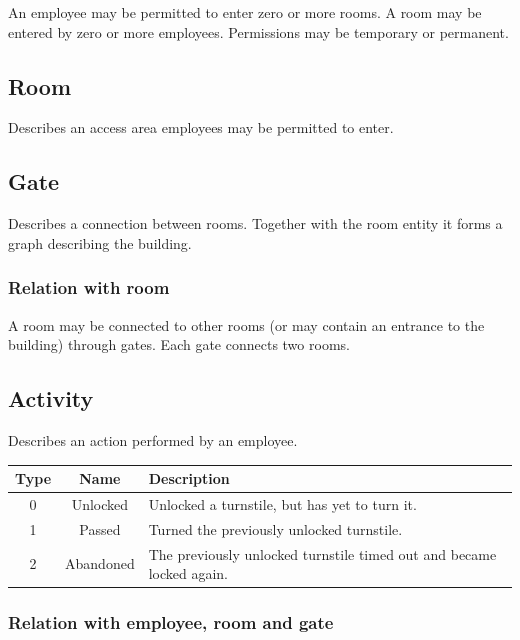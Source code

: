 \documentclass{article}
\begin{document}
	An employee may be permitted to enter zero or more rooms. A room may be
	entered by zero or more employees. Permissions may be temporary or
	permanent.
	
	\subsection{Room}
	
	Describes an access area employees may be permitted to enter.
	
	\subsection{Gate}
	
	Describes a connection between rooms. Together with the room entity it
	forms a graph describing the building.
	
	\subsubsection{Relation with room}
	
	A room may be connected to other rooms (or may contain an entrance to the
	building) through gates. Each gate connects two rooms.
	
	\subsection{Activity}
	
	Describes an action performed by an employee.
	
	\begin{center}
		\begin{tabular}{|c | c | p{10cm}|}
			\hline
			\textbf{Type} & \textbf{Name} & \textbf{Description} \\
			\hline
			0 & Unlocked & Unlocked a turnstile, but has yet to turn it. \\
			\hline
			1 & Passed & Turned the previously unlocked turnstile. \\
			\hline
			2 & Abandoned & The previously unlocked turnstile timed out and became locked again. \\
			\hline
		\end{tabular}
	\end{center}
	
	\subsubsection{Relation with employee, room and gate}
	
\end{document}
